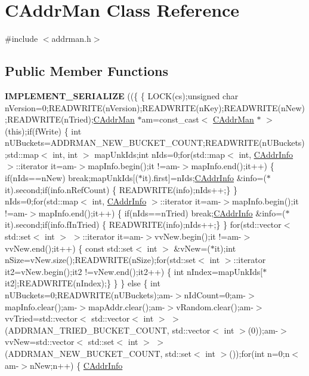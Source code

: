 \hypertarget{class_c_addr_man}{}\section{C\+Addr\+Man Class Reference}
\label{class_c_addr_man}


{\ttfamily \#include $<$addrman.\+h$>$}

\subsection*{Public Member Functions}
\begin{DoxyCompactItemize}
\item 
\mbox{\label{class_c_addr_man_a8eb4fa0a6666916b155ada726ca7c54e}} 
{\bfseries I\+M\+P\+L\+E\+M\+E\+N\+T\+\_\+\+S\+E\+R\+I\+A\+L\+I\+ZE} ((\{ \{ L\+O\+CK(cs);unsigned char n\+Version=0;R\+E\+A\+D\+W\+R\+I\+TE(n\+Version);R\+E\+A\+D\+W\+R\+I\+TE(n\+Key);R\+E\+A\+D\+W\+R\+I\+TE(n\+New);R\+E\+A\+D\+W\+R\+I\+TE(n\+Tried);\mbox{\hyperlink{class_c_addr_man}{C\+Addr\+Man}} $\ast$am=const\+\_\+cast$<$ \mbox{\hyperlink{class_c_addr_man}{C\+Addr\+Man}} $\ast$ $>$(this);if(f\+Write) \{ int n\+U\+Buckets=A\+D\+D\+R\+M\+A\+N\+\_\+\+N\+E\+W\+\_\+\+B\+U\+C\+K\+E\+T\+\_\+\+C\+O\+U\+NT;R\+E\+A\+D\+W\+R\+I\+TE(n\+U\+Buckets);std\+::map$<$ int, int $>$ map\+Unk\+Ids;int n\+Ids=0;for(std\+::map$<$ int, \mbox{\hyperlink{class_c_addr_info}{C\+Addr\+Info}} $>$\+::iterator it=am-\/$>$map\+Info.\+begin();it !=am-\/$>$map\+Info.\+end();it++) \{ if(n\+Ids==n\+New) break;map\+Unk\+Ids\mbox{[}($\ast$it).first\mbox{]}=n\+Ids;\mbox{\hyperlink{class_c_addr_info}{C\+Addr\+Info}} \&info=($\ast$it).second;if(info.\+n\+Ref\+Count) \{ R\+E\+A\+D\+W\+R\+I\+TE(info);n\+Ids++;\} \} n\+Ids=0;for(std\+::map$<$ int, \mbox{\hyperlink{class_c_addr_info}{C\+Addr\+Info}} $>$\+::iterator it=am-\/$>$map\+Info.\+begin();it !=am-\/$>$map\+Info.\+end();it++) \{ if(n\+Ids==n\+Tried) break;\mbox{\hyperlink{class_c_addr_info}{C\+Addr\+Info}} \&info=($\ast$it).second;if(info.\+f\+In\+Tried) \{ R\+E\+A\+D\+W\+R\+I\+TE(info);n\+Ids++;\} \} for(std\+::vector$<$ std\+::set$<$ int $>$ $>$\+::iterator it=am-\/$>$vv\+New.\+begin();it !=am-\/$>$vv\+New.\+end();it++) \{ const std\+::set$<$ int $>$ \&v\+New=($\ast$it);int n\+Size=v\+New.\+size();R\+E\+A\+D\+W\+R\+I\+TE(n\+Size);for(std\+::set$<$ int $>$\+::iterator it2=v\+New.\+begin();it2 !=v\+New.\+end();it2++) \{ int n\+Index=map\+Unk\+Ids\mbox{[}$\ast$it2\mbox{]};R\+E\+A\+D\+W\+R\+I\+TE(n\+Index);\} \} \} else \{ int n\+U\+Buckets=0;R\+E\+A\+D\+W\+R\+I\+TE(n\+U\+Buckets);am-\/$>$n\+Id\+Count=0;am-\/$>$map\+Info.\+clear();am-\/$>$map\+Addr.\+clear();am-\/$>$v\+Random.\+clear();am-\/$>$vv\+Tried=std\+::vector$<$ std\+::vector$<$ int $>$ $>$(A\+D\+D\+R\+M\+A\+N\+\_\+\+T\+R\+I\+E\+D\+\_\+\+B\+U\+C\+K\+E\+T\+\_\+\+C\+O\+U\+NT, std\+::vector$<$ int $>$(0));am-\/$>$vv\+New=std\+::vector$<$ std\+::set$<$ int $>$ $>$(A\+D\+D\+R\+M\+A\+N\+\_\+\+N\+E\+W\+\_\+\+B\+U\+C\+K\+E\+T\+\_\+\+C\+O\+U\+NT, std\+::set$<$ int $>$());for(int n=0;n$<$ am-\/$>$n\+New;n++) \{ \mbox{\hyperlink{class_c_addr_info}{C\+Addr\+Info}} 
\end{DoxyCompactItemize}
